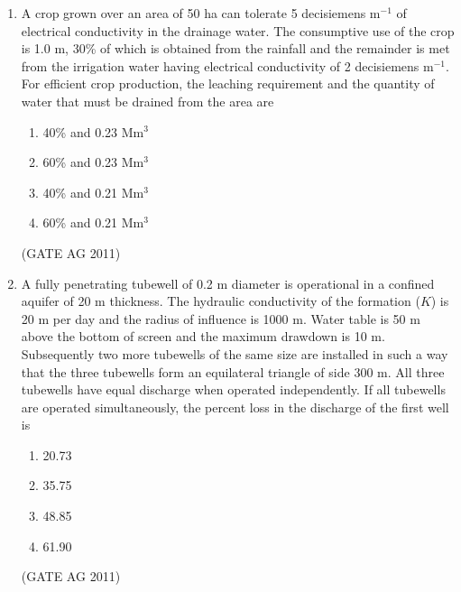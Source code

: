 \documentclass[journal,12pt,onecolumn]{IEEEtran}
\theoremstyle{remark}
\begin{document}
\begin{enumerate}
\begin{figure}[h!]
\end{figure}

\begin{multicols}{4}
\begin{enumerate}
    \item 11.50
    \item 14.25
    \item 15.80
    \item 17.25
\end{enumerate}
\end{multicols}
\hfill{(GATE AG 2011)}


\item 
A crop grown over an area of 50 ha can tolerate 5 decisiemens m$^{-1}$ of electrical conductivity in the drainage water. The consumptive use of the crop is 1.0 m, 30\% of which is obtained from the rainfall and the remainder is met from the irrigation water having electrical conductivity of 2 decisiemens m$^{-1}$. For efficient crop production, the leaching requirement and the quantity of water that must be drained from the area are
\begin{multicols}{2}
\begin{enumerate}
    \item 40\% and 0.23 Mm$^3$
    \item 60\% and 0.23 Mm$^3$
    \item 40\% and 0.21 Mm$^3$
    \item 60\% and 0.21 Mm$^3$
\end{enumerate}
\end{multicols}
\hfill{(GATE AG 2011)}

\item 
A fully penetrating tubewell of 0.2 m diameter is operational in a confined aquifer of 20 m thickness. The hydraulic conductivity of the formation ($K$) is 20 m per day and the radius of influence is 1000 m. Water table is 50 m above the bottom of screen and the maximum drawdown is 10 m. Subsequently two more tubewells of the same size are installed in such a way that the three tubewells form an equilateral triangle of side 300 m. All three tubewells have equal discharge when operated independently. If all tubewells are operated simultaneously, the percent loss in the discharge of the first well is
\begin{multicols}{4}
\begin{enumerate}
    \item 20.73
    \item 35.75
    \item 48.85
    \item 61.90
\end{enumerate}
\end{multicols}
\hfill{(GATE AG 2011)}


\end{enumerate}
\end{document}
